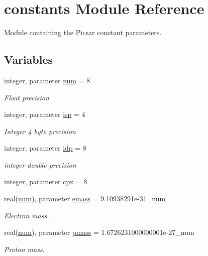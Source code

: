 \hypertarget{namespaceconstants}{}\section{constants Module Reference}
\label{namespaceconstants}


Module containing the Picsar constant parameters.  


\subsection*{Variables}
\begin{DoxyCompactItemize}
\item 
integer, parameter \hyperlink{namespaceconstants_afe19f7f8af171411c51fb763b36e3823}{num} = 8
\begin{DoxyCompactList}\small\item\em Float precision \end{DoxyCompactList}\item 
integer, parameter \hyperlink{namespaceconstants_a5a2ae450a00d2a29f9b70dcb776f7a2f}{isp} = 4
\begin{DoxyCompactList}\small\item\em Integer 4 byte precision \end{DoxyCompactList}\item 
integer, parameter \hyperlink{namespaceconstants_ae345db51770e3628e6aaf76e6a45e160}{idp} = 8
\begin{DoxyCompactList}\small\item\em integer double precision \end{DoxyCompactList}\item 
integer, parameter \hyperlink{namespaceconstants_a5709f0ae2ee52b1906446ad25ed0f587}{cpx} = 8
\item 
real(\hyperlink{namespaceconstants_afe19f7f8af171411c51fb763b36e3823}{num}), parameter \hyperlink{namespaceconstants_ad39536f583f0861abb2fb19a27c56fc8}{emass} = 9.\+10938291e-\/31\+\_\+num
\begin{DoxyCompactList}\small\item\em Electron mass. \end{DoxyCompactList}\item 
real(\hyperlink{namespaceconstants_afe19f7f8af171411c51fb763b36e3823}{num}), parameter \hyperlink{namespaceconstants_a44f3d8cbf9c39db63d7533d985cc51c3}{pmass} = 1.\+6726231000000001e-\/27\+\_\+num
\begin{DoxyCompactList}\small\item\em Proton mass. \end{DoxyCompactList}\item 

\end{DoxyCompactItemize}
